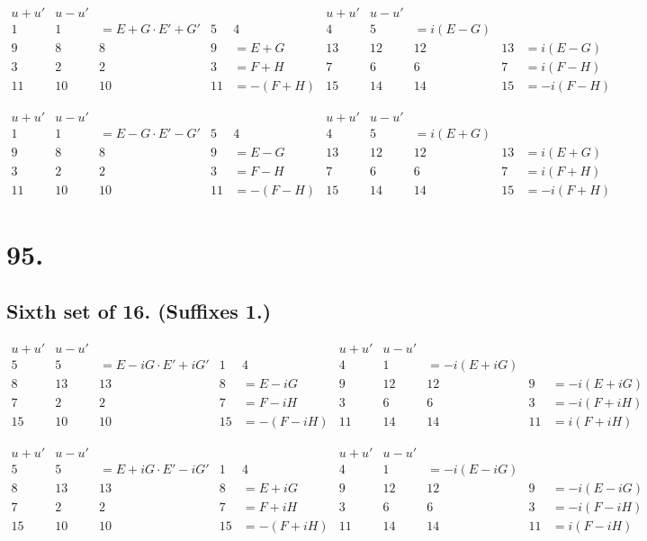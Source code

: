 \documentclass[11pt,a4paper]{article}
\begin{document}
\[
\begin{array}{c|cccc|c|cccc}
u+u' & u-u' & & & & u+u' & u-u' & & & \\
\hline
1 & 1 & = E+G \cdot E'+G' & 5 & 4 & 4 & 5 & = i(E-G) \\
9 & 8 & 8 & 9 & = E+G & 13 & 12 & 12 & 13 & = i(E-G) \\
3 & 2 & 2 & 3 & = F+H & 7 & 6 & 6 & 7 & = i(F-H) \\
11 & 10 & 10 & 11 & = -(F+H) & 15 & 14 & 14 & 15 & = -i(F-H)
\end{array}
\]

\[
\begin{array}{c|cccc|c|cccc}
u+u' & u-u' & & & & u+u' & u-u' & & & \\
\hline
1 & 1 & = E-G \cdot E'-G' & 5 & 4 & 4 & 5 & = i(E+G) \\
9 & 8 & 8 & 9 & = E-G & 13 & 12 & 12 & 13 & = i(E+G) \\
3 & 2 & 2 & 3 & = F-H & 7 & 6 & 6 & 7 & = i(F+H) \\
11 & 10 & 10 & 11 & = -(F-H) & 15 & 14 & 14 & 15 & = -i(F+H)
\end{array}
\]

\newpage
\section*{95.}
\label{sec:95}

\subsection*{Sixth set of 16. (Suffixes 1.)}

\[
\begin{array}{c|cccc|c|cccc}
u+u' & u-u' & & & & u+u' & u-u' & & & \\
\hline
5 & 5 & = E-iG \cdot E'+iG' & 1 & 4 & 4 & 1 & = -i(E+iG) \\
8 & 13 & 13 & 8 & = E-iG & 9 & 12 & 12 & 9 & = -i(E+iG) \\
7 & 2 & 2 & 7 & = F-iH & 3 & 6 & 6 & 3 & = -i(F+iH) \\
15 & 10 & 10 & 15 & = -(F-iH) & 11 & 14 & 14 & 11 & = i(F+iH)
\end{array}
\]

\[
\begin{array}{c|cccc|c|cccc}
u+u' & u-u' & & & & u+u' & u-u' & & & \\
\hline
5 & 5 & = E+iG \cdot E'-iG' & 1 & 4 & 4 & 1 & = -i(E-iG) \\
8 & 13 & 13 & 8 & = E+iG & 9 & 12 & 12 & 9 & = -i(E-iG) \\
7 & 2 & 2 & 7 & = F+iH & 3 & 6 & 6 & 3 & = -i(F-iH) \\
15 & 10 & 10 & 15 & = -(F+iH) & 11 & 14 & 14 & 11 & = i(F-iH)
\end{array}
\]
\end{document}
